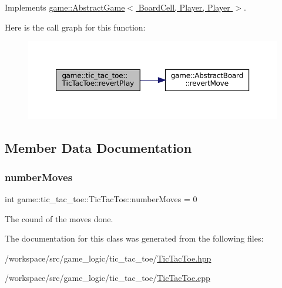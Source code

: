 Implements \hyperlink{classgame_1_1_abstract_game_af6088ae12ed47989dde7f8869e79d934}{game\+::\+Abstract\+Game$<$ Board\+Cell, Player, Player $>$}.

Here is the call graph for this function\+:
\nopagebreak
\begin{figure}[H]
\begin{center}
\leavevmode
\includegraphics[width=350pt]{classgame_1_1tic__tac__toe_1_1_tic_tac_toe_a38a848001838eb4ccbafa9800f3cbfd4_cgraph}
\end{center}
\end{figure}


\subsection{Member Data Documentation}
\mbox{\label{classgame_1_1tic__tac__toe_1_1_tic_tac_toe_aa4d91a411bde0547ce24551f61f4772b}} 
\subsubsection{\texorpdfstring{number\+Moves}{numberMoves}}
{\footnotesize\ttfamily int game\+::tic\+\_\+tac\+\_\+toe\+::\+Tic\+Tac\+Toe\+::number\+Moves = 0\hspace{0.3cm}{\ttfamily [protected]}}



The cound of the moves done. 



The documentation for this class was generated from the following files\+:\begin{DoxyCompactItemize}
\item 
/workspace/src/game\+\_\+logic/tic\+\_\+tac\+\_\+toe/\hyperlink{_tic_tac_toe_8hpp}{Tic\+Tac\+Toe.\+hpp}\item 
/workspace/src/game\+\_\+logic/tic\+\_\+tac\+\_\+toe/\hyperlink{_tic_tac_toe_8cpp}{Tic\+Tac\+Toe.\+cpp}\end{DoxyCompactItemize}
